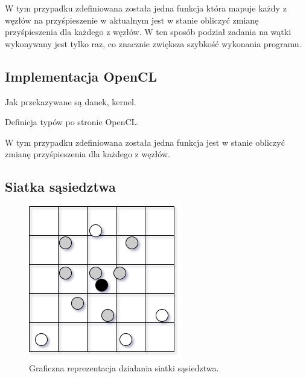 \documentclass[12pt, letterpaper]{report}
\begin{document}
    
    W tym przypadku zdefiniowana została jedna funkcja która mapuje każdy z węzłów na przyśpieszenie
    w aktualnym 
    jest w stanie obliczyć zmianę przyśpieszenia 
    dla każdego z węzłów. W ten sposób podział zadania na wątki wykonywany jest tylko raz, co 
    znacznie zwiększa szybkość wykonania programu.

    \subsection{Implementacja OpenCL}
    Jak przekazywane są danek, kernel.
    
    Definicja typów po stronie OpenCL.

    
    W tym przypadku zdefiniowana została jedna funkcja jest w stanie obliczyć zmianę przyśpieszenia 
    dla każdego z węzłów.

    \subsection{Siatka sąsiedztwa}

    \begin{figure}
        \includegraphics[width=0.99\linewidth]{neib_grid.drawio}
        \caption{
            Graficzna reprezentacja działania siatki sąsiedztwa.
        }
    \end{figure}
\end{document}
